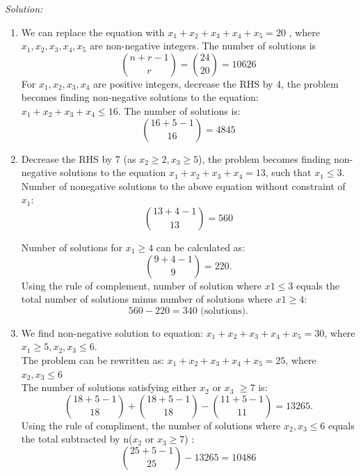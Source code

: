 \documentclass[a4paper]{article}
\begin{document}
	\textit{Solution:}
	\begin{enumerate}
		\item We can replace the equation with $x_1 + x_2 + x_3 + x_4 + x_5 = 20$ , where $x_1, x_2, x_3, x_4, x_5$ are non-negative integers. The number of solutions is 
		\begin{equation*}
		{n+r-1 \choose r}  = {24 \choose 20} = 10626
		\end{equation*}
		For $x_1, x_2, x_3, x_4$ are positive integers, decrease the RHS by 4, the problem becomes finding non-negative solutions to the equation: $x_1 + x_2 + x_3 + x_4 \leq 16$. The number of solutions is:
		\begin{equation*}
		{16+5-1 \choose 16} = 4845
		\end{equation*}
		\item Decrease the RHS by 7 (as $x_2 \geq 2, x_3 \geq 5$), the problem becomes finding non-negative solutions to the equation $x_1 + x_2 + x_3 + x_4 = 13$, such that $x_1 \leq 3$.\\
		Number of nonegative solutions to the above equation without constraint of $x_1$:
		\begin{equation*}
		    {13+4-1 \choose 13} = 560
		\end{equation*}
		    
		Number of solutions for $x_1 \geq 4$ can be calculated as:
		\begin{equation*}
            {9+4-1 \choose 9} = 220.
		\end{equation*}
		Using the rule of complement, number of solution where $x1 \leq 3$ equals the total number of solutions minus number of solutions where $x1 \geq 4$:
		\begin{equation*}
		560  - 220 = 340 \text{ (solutions).}		
		\end{equation*}
		\item We find non-negative solution to equation: $x_1 + x_2 + x_3 + x_4 + x_5 = 30$, where $x_1 \geq 5, x_2, x_3 \leq 6$.\\ 
		The problem can be rewritten as: $x_1 + x_2 + x_3 + x_4 + x_5 = 25$, where $ x_2, x_3 \leq 6$\\
		The number of solutions satisfying either $x_2$ or $x_3$ $\geq 7$ is: 
		\begin{equation*}
		{18+5-1 \choose 18} + {18 + 5 -1 \choose 18} - {11+5-1 \choose 11} = 13265.
		\end{equation*}
		Using the rule of compliment, the number of solutions where $x_2, x_3 \leq 6$ equals the total subtracted by n($x_2$ or $x_3 \geq 7$) :
		\begin{equation*}
		{25+5-1 \choose 25} - 13265 = 10486
		\end{equation*}
	\end{enumerate}
	
\end{document}
